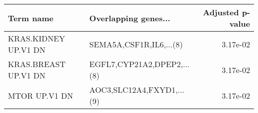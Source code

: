 \begin{tabular}{llr}
\toprule
           Term name &       Overlapping genes... &  Adjusted p-value \\
\midrule
KRAS.KIDNEY UP.V1 DN &    SEMA5A,CSF1R,IL6,...(8) &          3.17e-02 \\
KRAS.BREAST UP.V1 DN & EGFL7,CYP21A2,DPEP2,...(8) &          3.17e-02 \\
       MTOR UP.V1 DN &  AOC3,SLC12A4,FXYD1,...(9) &          3.17e-02 \\
\bottomrule
\end{tabular}
